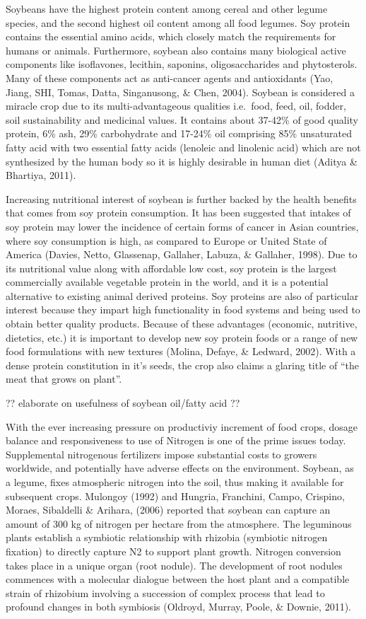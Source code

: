 \documentclass[
]{article}
\begin{document}
Soybeans have the highest protein content among cereal and other legume species, and the second highest oil content among all food legumes. Soy protein contains the essential amino acids, which closely match the requirements for humans or animals. Furthermore, soybean also contains many biological active components like isoflavones, lecithin, saponins, oligosaccharides and phytosterols. Many of these components act as anti-cancer agents and antioxidants (Yao, Jiang, SHI, Tomas, Datta, Singanusong, \& Chen, 2004). Soybean is considered a miracle crop due to its multi-advantageous qualities i.e.~food, feed, oil, fodder, soil sustainability and medicinal values. It contains about 37-42\% of good quality protein, 6\% ash, 29\% carbohydrate and 17-24\% oil comprising 85\% unsaturated fatty acid with two essential fatty acids (lenoleic and linolenic acid) which are not synthesized by the human body so it is highly desirable in human diet (Aditya \& Bhartiya, 2011).

Increasing nutritional interest of soybean is further backed by the health benefits that comes from soy protein consumption. It has been suggested that intakes of soy protein may lower the incidence of certain forms of cancer in Asian countries, where soy consumption is high, as compared to Europe or United State of America (Davies, Netto, Glassenap, Gallaher, Labuza, \& Gallaher, 1998). Due to its nutritional value along with affordable low cost, soy protein is the largest commercially available vegetable protein in the world, and it is a potential alternative to existing animal derived proteins. Soy proteins are also of particular interest because they impart high functionality in food systems and being used to obtain better quality products. Because of these advantages (economic, nutritive, dietetics, etc.) it is important to develop new soy protein foods or a range of new food formulations with new textures (Molina, Defaye, \& Ledward, 2002). With a dense protein constitution in it's seeds, the crop also claims a glaring title of ``the meat that grows on plant''.

?? elaborate on usefulness of soybean oil/fatty acid ??

With the ever increasing pressure on productiviy increment of food crops, dosage balance and responsiveness to use of Nitrogen is one of the prime issues today. Supplemental nitrogenous fertilizers impose substantial costs to growers worldwide, and potentially have adverse effects on the environment. Soybean, as a legume, fixes atmospheric nitrogen into the soil, thus making it available for subsequent crops. Mulongoy (1992) and Hungria, Franchini, Campo, Crispino, Moraes, Sibaldelli \& Arihara, (2006) reported that soybean can capture an amount of 300 kg of nitrogen per hectare from the atmosphere. The leguminous plants establish a symbiotic relationship with rhizobia (symbiotic nitrogen fixation) to directly capture N2 to support plant growth. Nitrogen conversion takes place in a unique organ (root nodule). The development of root nodules commences with a molecular dialogue between the host plant and a compatible strain of rhizobium involving a succession of complex process that lead to profound changes in both symbiosis (Oldroyd, Murray, Poole, \& Downie, 2011).
\end{document}
